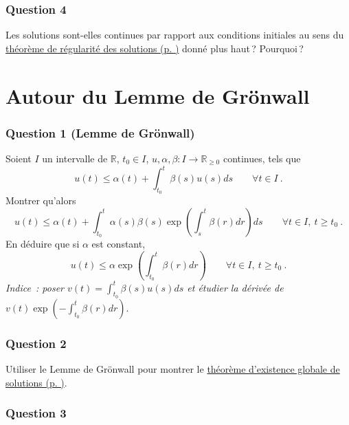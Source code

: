 \hypertarget{tor-4}{%
\subsubsection*{Question 4}\label{tor-4}}


Les solutions sont-elles continues par rapport aux conditions initiales
au sens du \protect\hyperlink{theo_reg_CI}{théorème de régularité des
solutions (p. \pageref*{theo_reg_CI})} donné plus haut\,? Pourquoi\,?

\hypertarget{exo_gronwall}{%
\section{Autour du Lemme de Grönwall}\label{exo_gronwall}}

\hypertarget{gro-1}{%
\subsubsection*{Question 1 (Lemme de Grönwall)}\label{gro-1}}


Soient \(I\) un intervalle de \(\mathbb{R}\), \(t_0 \in I\),
\(u,\alpha, \beta : I\to\mathbb{R}_{\geq 0}\) continues, tels que \[
u(t) \leq \alpha(t) + \int_{t_0}^{t}\beta(s) u(s)ds \qquad \forall t\in I \ .
\] Montrer qu'alors \[
u(t) \leq \alpha(t) +  \int_{t_0}^{t} \alpha(s)\beta(s) \exp\left(\int_{s}^t\beta(r)dr \right) ds\qquad \forall t\in I, \ t\geq t_0 \ .
\] En déduire que si \(\alpha\) est constant, \[
u(t) \leq \alpha \exp\left(\int_{t_0}^t\beta(r)dr \right) \qquad \forall t\in I, \ t\geq t_0 \ .
\] \emph{Indice~: poser \(v(t)=\int_{t_0}^t\beta(s)u(s)ds\) et étudier
la dérivée de \(v(t)\exp\left(-\int_{t_0}^t\beta(r)dr\right)\)}.

\hypertarget{gro-2}{%
\subsubsection*{Question 2}\label{gro-2}}


Utiliser le Lemme de Grönwall pour montrer le
\protect\hyperlink{theo_exist_glob}{théorème d'existence globale de
solutions (p. \pageref*{theo_exist_glob})}.

\hypertarget{gro-3}{%
\subsubsection*{Question 3}\label{gro-3}}

